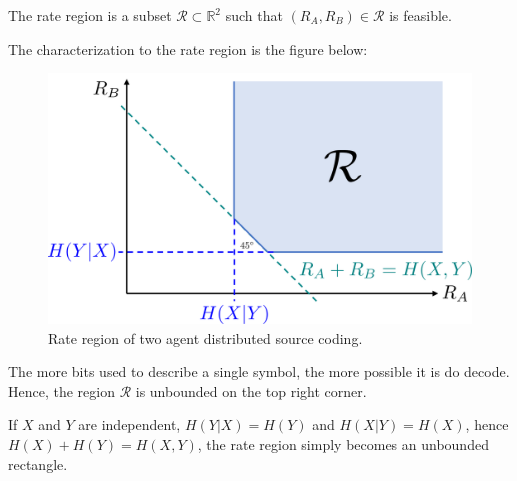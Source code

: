 \begin{definition}
    The rate region is a subset $\mathcal{R}\subset\mathbb{R}^2$ such that $(R_A,R_B)\in\mathcal{R}$ is feasible.
\end{definition}

The characterization to the rate region is the figure below:
\begin{figure}[H]
    \centering
    \includegraphics[width=0.6\linewidth]{figures/w5_slepian_wolf.png}
    \caption{Rate region of two agent distributed source coding.}
\end{figure}
\begin{remark}
    The more bits used to describe a single symbol, the more possible it is do decode. Hence, the region $\mathcal{R}$ is unbounded on the top right corner.

    If $X$ and $Y$ are independent, $H(Y\vert X) = H(Y)$ and $H(X\vert Y) = H(X)$, hence $H(X)+H(Y) = H(X,Y)$, the rate region simply becomes an unbounded rectangle.
\end{remark}

